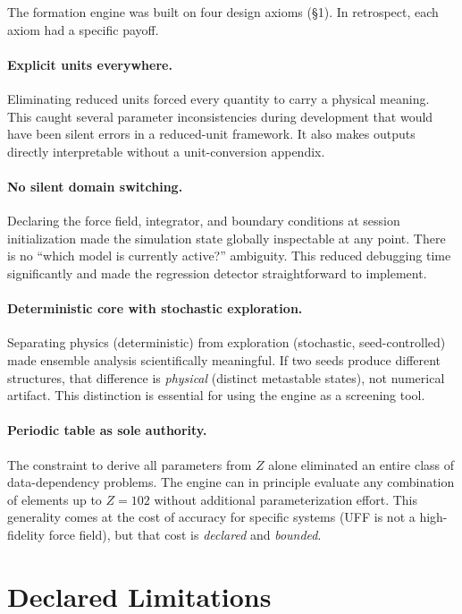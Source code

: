 \documentclass[11pt]{article}
\begin{document}
The formation engine was built on four design axioms (\S1).  In
retrospect, each axiom had a specific payoff.

\paragraph{Explicit units everywhere.}
Eliminating reduced units forced every quantity to carry a physical
meaning.  This caught several parameter inconsistencies during
development that would have been silent errors in a reduced-unit
framework.  It also makes outputs directly interpretable without
a unit-conversion appendix.

\paragraph{No silent domain switching.}
Declaring the force field, integrator, and boundary conditions at
session initialization made the simulation state globally inspectable
at any point.  There is no ``which model is currently active?''
ambiguity.  This reduced debugging time significantly and made
the regression detector straightforward to implement.

\paragraph{Deterministic core with stochastic exploration.}
Separating physics (deterministic) from exploration (stochastic,
seed-controlled) made ensemble analysis scientifically meaningful.
If two seeds produce different structures, that difference is
\textit{physical} (distinct metastable states), not numerical
artifact.  This distinction is essential for using the engine
as a screening tool.

\paragraph{Periodic table as sole authority.}
The constraint to derive all parameters from $Z$ alone eliminated
an entire class of data-dependency problems.  The engine can in
principle evaluate any combination of elements up to $Z = 102$
without additional parameterization effort.  This generality
comes at the cost of accuracy for specific systems (UFF is not
a high-fidelity force field), but that cost is \textit{declared}
and \textit{bounded}.

\section{Declared Limitations}
\end{document}
